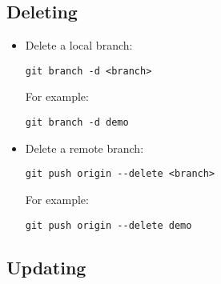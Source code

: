 \subsection{Deleting}

\begin{itemize}
    \item Delete a local branch:
    \begin{verbatim}
git branch -d <branch>
    \end{verbatim}
    For example:
    \begin{verbatim}
git branch -d demo
    \end{verbatim}
    \item Delete a remote branch:
    \begin{verbatim}
git push origin --delete <branch> 
    \end{verbatim}
    For example:
    \begin{verbatim}
git push origin --delete demo
    \end{verbatim}
\end{itemize}


\subsection{Updating}

